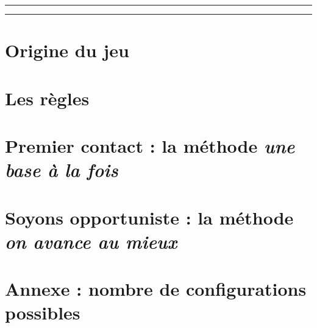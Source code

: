 \documentclass[a4,11pt]{article}
\begin{document}

\vspace{3cm}

\hrule

\tableofcontents

\vspace{4ex}

\hrule

\newpage



\section{Origine du jeu}    %
    


\section{Les règles}    %
    


\section{Premier contact : la méthode \textit{\og une base à la fois \fg}}    %
    


\section{Soyons opportuniste : la méthode \textit{\og on avance au mieux \fg}}    %
    


\section{Annexe : nombre de configurations possibles}    %
    
\end{document}
